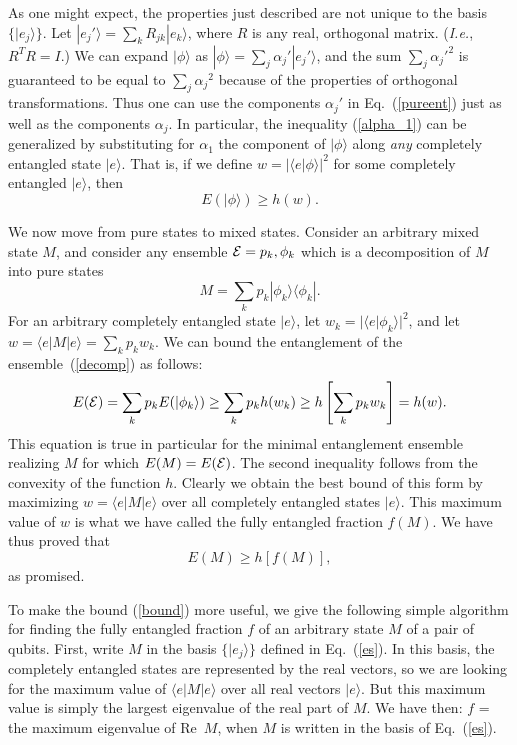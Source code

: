 As one might expect, the properties just described are not unique
to the basis $\{|e_j\rangle\}$.  Let $|e_j'\rangle =
\sum_k R_{jk}|e_k\rangle$, where $R$ is any real, orthogonal
matrix.  ({\em I.e.}, $R^TR = I$.)  We can expand $|\phi\rangle$
as $|\phi\rangle = \sum_j\alpha_j'|e_j'\rangle$, and the sum
$\sum_j{\alpha_j'}^2$ is guaranteed to be equal to
$\sum_j{\alpha_j}^2$ because
of the properties of orthogonal transformations.  Thus one can
use the components $\alpha_j'$ in Eq.~(\ref{pureent}) just as
well as the components $\alpha_j$.  In particular, the inequality
(\ref{alpha_1}) can be generalized by substituting for $\alpha_1$
the component of $|\phi\rangle$ along {\em any} completely entangled
state $|e\rangle$.  That is, if we define $w = |\langle e|\phi
\rangle |^2$ for some completely entangled $|e\rangle$, then
\begin{equation}
E(|\phi\rangle) \ge h(w).  \label{E>h}
\end{equation}
 
We now move from pure states to mixed states.
Consider an arbitrary mixed state $M$, and consider any
ensemble ${\cal E}={p_k,\phi_k}$ which is a decomposition of $M$ 
into pure states
\begin{equation}
M = \sum_k p_k |\phi_k\rangle\langle\phi_k|. \label{decomp}
\end{equation}
For an arbitrary completely entangled state $|e\rangle$, let
$w_k = |\langle e|\phi_k\rangle|^2$, and let
$w = \langle e|M|e \rangle = \sum_k p_k w_k$.  We can
bound the entanglement of the ensemble~(\ref{decomp})
as follows:
\begin{equation}
E({\cal E}) = \sum_k p_k E(|\phi_k\rangle)
\ge \sum_k p_k h(w_k) \ge
h\left[\sum_k p_k w_k\right] = h(w).  \label{string}
\end{equation}
This equation is true in particular for the minimal entanglement
ensemble realizing $M$ for which $E(M)=E(\cal E)$.
The second inequality follows from the convexity of the function
$h$.  Clearly we obtain the best bound of this form by
maximizing $w=\langle e|M|e \rangle$ over all completely
entangled states $|e\rangle$.  This maximum value of $w$ is
what we have called the fully entangled fraction $f(M)$.  We
have thus proved that
\begin{equation}
E(M) \ge h[f(M)], \label{bound}
\end{equation}
as promised.
 
To make the bound (\ref{bound}) more useful, we give the
following simple algorithm for finding the fully entangled
fraction $f$ of an arbitrary state $M$ of a pair
of qubits.  First, write $M$ in the basis $\{|e_j\rangle\}$
defined in Eq.~(\ref{es}).  In this basis, the completely
entangled states are represented by the real vectors,
so we are looking for the maximum value of
$\langle e|M|e \rangle$ over all real vectors $|e\rangle$.  But
this maximum value is simply the largest eigenvalue of the real
part of $M$. We have then: $f$ = the maximum eigenvalue of
Re~$M$, when $M$ is written in the basis of Eq.~(\ref{es}).
 
